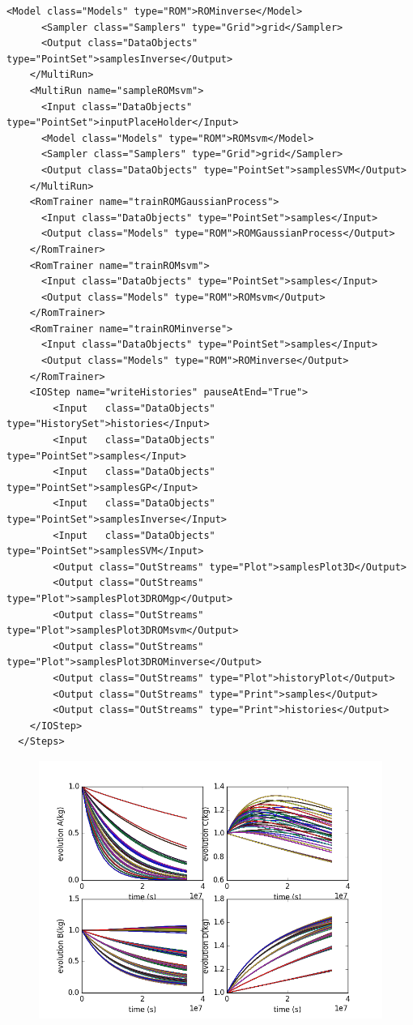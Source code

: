 \begin{enumerate}
\begin{lstlisting}[style=XML,morekeywords={arg,extension,pauseAtEnd,overwrite}]
      <Model class="Models" type="ROM">ROMinverse</Model>
      <Sampler class="Samplers" type="Grid">grid</Sampler>
      <Output class="DataObjects" type="PointSet">samplesInverse</Output>
    </MultiRun>
    <MultiRun name="sampleROMsvm">
      <Input class="DataObjects" type="PointSet">inputPlaceHolder</Input>
      <Model class="Models" type="ROM">ROMsvm</Model>
      <Sampler class="Samplers" type="Grid">grid</Sampler>
      <Output class="DataObjects" type="PointSet">samplesSVM</Output>
    </MultiRun>
    <RomTrainer name="trainROMGaussianProcess">
      <Input class="DataObjects" type="PointSet">samples</Input>
      <Output class="Models" type="ROM">ROMGaussianProcess</Output>
    </RomTrainer>
    <RomTrainer name="trainROMsvm">
      <Input class="DataObjects" type="PointSet">samples</Input>
      <Output class="Models" type="ROM">ROMsvm</Output>
    </RomTrainer>
    <RomTrainer name="trainROMinverse">
      <Input class="DataObjects" type="PointSet">samples</Input>
      <Output class="Models" type="ROM">ROMinverse</Output>
    </RomTrainer>
    <IOStep name="writeHistories" pauseAtEnd="True">
        <Input   class="DataObjects"      type="HistorySet">histories</Input>
        <Input   class="DataObjects"      type="PointSet">samples</Input>
        <Input   class="DataObjects"      type="PointSet">samplesGP</Input>
        <Input   class="DataObjects"      type="PointSet">samplesInverse</Input>
        <Input   class="DataObjects"      type="PointSet">samplesSVM</Input>
        <Output class="OutStreams" type="Plot">samplesPlot3D</Output>
        <Output class="OutStreams" type="Plot">samplesPlot3DROMgp</Output>
        <Output class="OutStreams" type="Plot">samplesPlot3DROMsvm</Output>
        <Output class="OutStreams" type="Plot">samplesPlot3DROMinverse</Output>
        <Output class="OutStreams" type="Plot">historyPlot</Output>
        <Output class="OutStreams" type="Print">samples</Output>
        <Output class="OutStreams" type="Print">histories</Output>
    </IOStep>
  </Steps>
\end{lstlisting}
 \begin{figure}[h!]
  \centering
  \includegraphics[scale=0.7]{pics/reducedOrderModelingHistoriesPhysicalModel.png}

\end{figure}
\end{enumerate}
